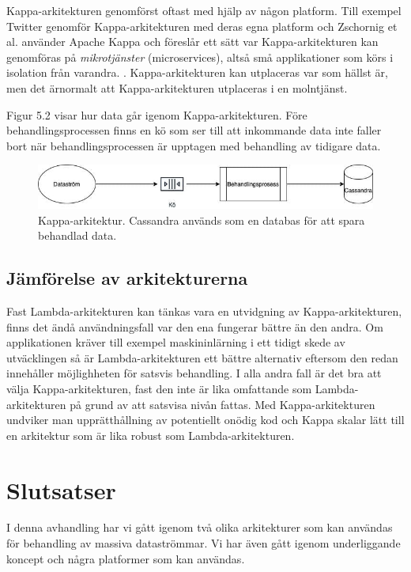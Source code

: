 Kappa-arkitekturen genomförst oftast med hjälp av någon platform. Till exempel
Twitter genomför Kappa-arkitekturen med deras egna platform \citep{yang2018robust}
och Zschornig et al. använder Apache Kappa och föreslår ett sätt var 
Kappa-arkitekturen kan genomföras på \textit{mikrotjänster} (microservices), altså små applikationer som körs i isolation från varandra.
\citep{zschornig2017personal}. Kappa-arkitekturen kan utplaceras var som hällst är,
men det ärnormalt att Kappa-arkitekturen utplaceras i en molntjänst.

Figur 5.2 visar hur data går igenom Kappa-arkitekturen. Före behandlingsprocessen
finns en kö som ser till att inkommande data inte faller bort när behandlingsprocessen är upptagen med behandling av tidigare data.

\begin{figure}[h]
    \centering
    \includegraphics[scale=0.8]{img/kappa-arch.jpg}
    \caption{Kappa-arkitektur. Cassandra används som en databas för att spara behandlad data.}
    \label{fig:mesh1}
\end{figure}

\section{Jämförelse av arkitekturerna}

Fast Lambda-arkitekturen kan tänkas vara en utvidgning av Kappa-arkitekturen,
finns det ändå användningsfall var den ena fungerar bättre än den andra. Om
applikationen kräver till exempel maskininlärning i ett tidigt skede av utväcklingen så är
Lambda-arkitekturen ett bättre alternativ eftersom den redan innehåller möjlighheten för satsvis behandling. I alla andra fall är det bra att välja
Kappa-arkitekturen, fast den inte är lika omfattande som Lambda-arkitekturen på grund av att satsvisa nivån fattas. Med Kappa-arkitekturen undviker man upprätthållning av potentiellt onödig kod och Kappa skalar lätt till en arkitektur
som är lika robust som Lambda-arkitekturen.

\chapter{Slutsatser}

I denna avhandling har vi gått igenom två olika arkitekturer som kan användas för
behandling av massiva dataströmmar. Vi har även gått igenom underliggande koncept
och några platformer som kan användas.


